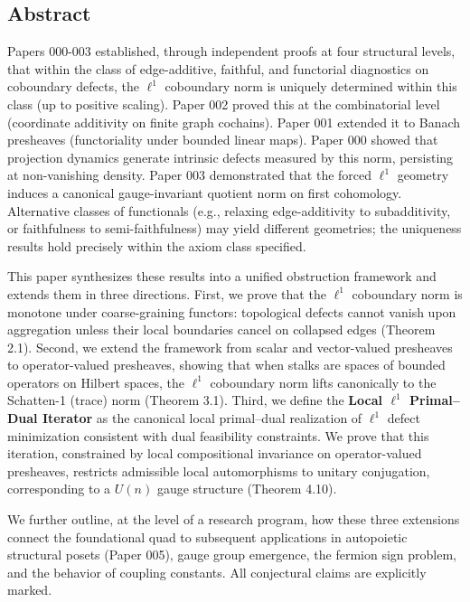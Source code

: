 \documentclass[
]{article}
\begin{document}
\subsection{Abstract}\label{abstract}

Papers 000-003 established, through independent proofs at four
structural levels, that within the class of edge-additive, faithful, and
functorial diagnostics on coboundary defects, the \(\ell^1\) coboundary
norm is uniquely determined within this class (up to positive scaling).
Paper 002 proved this at the combinatorial level (coordinate additivity
on finite graph cochains). Paper 001 extended it to Banach presheaves
(functoriality under bounded linear maps). Paper 000 showed that
projection dynamics generate intrinsic defects measured by this norm,
persisting at non-vanishing density. Paper 003 demonstrated that the
forced \(\ell^1\) geometry induces a canonical gauge-invariant quotient
norm on first cohomology. Alternative classes of functionals (e.g.,
relaxing edge-additivity to subadditivity, or faithfulness to
semi-faithfulness) may yield different geometries; the uniqueness
results hold precisely within the axiom class specified.

This paper synthesizes these results into a unified obstruction
framework and extends them in three directions. First, we prove that the
\(\ell^1\) coboundary norm is monotone under coarse-graining functors:
topological defects cannot vanish upon aggregation unless their local
boundaries cancel on collapsed edges (Theorem 2.1). Second, we extend
the framework from scalar and vector-valued presheaves to
operator-valued presheaves, showing that when stalks are spaces of
bounded operators on Hilbert spaces, the \(\ell^1\) coboundary norm
lifts canonically to the Schatten-1 (trace) norm (Theorem 3.1). Third,
we define the \textbf{Local \(\ell^1\) Primal--Dual Iterator} as the
canonical local primal--dual realization of \(\ell^1\) defect
minimization consistent with dual feasibility constraints. We prove that
this iteration, constrained by local compositional invariance on
operator-valued presheaves, restricts admissible local automorphisms to
unitary conjugation, corresponding to a \(U(n)\) gauge structure
(Theorem 4.10).

We further outline, at the level of a research program, how these three
extensions connect the foundational quad to subsequent applications in
autopoietic structural posets (Paper 005), gauge group emergence, the
fermion sign problem, and the behavior of coupling constants. All
conjectural claims are explicitly marked.
\end{document}
